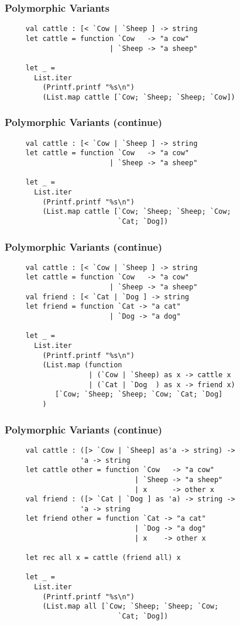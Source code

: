 \documentclass{beamer}
\begin{document}
\begin{frame}[fragile]
  \frametitle{Polymorphic Variants}
    \begin{lstlisting}
     val cattle : [< `Cow | `Sheep ] -> string 
     let cattle = function `Cow   -> "a cow" 
                         | `Sheep -> "a sheep" 

     let _ = 
       List.iter 
         (Printf.printf "%s\n") 
         (List.map cattle [`Cow; `Sheep; `Sheep; `Cow])
  \end{lstlisting}  
  
\end{frame}

\begin{frame}[fragile]
  \frametitle{Polymorphic Variants (continue)}
  \begin{lstlisting}
     val cattle : [< `Cow | `Sheep ] -> string 
     let cattle = function `Cow   -> "a cow" 
                         | `Sheep -> "a sheep" 

     let _ = 
       List.iter 
         (Printf.printf "%s\n") 
         (List.map cattle [`Cow; `Sheep; `Sheep; `Cow; 
                           `Cat; `Dog])
  \end{lstlisting}  


\end{frame}

\begin{frame}[fragile]
  \frametitle{Polymorphic Variants (continue)}
  \begin{lstlisting}
     val cattle : [< `Cow | `Sheep ] -> string 
     let cattle = function `Cow   -> "a cow" 
                         | `Sheep -> "a sheep" 
     val friend : [< `Cat | `Dog ] -> string
     let friend = function `Cat -> "a cat" 
                         | `Dog -> "a dog"

     let _ = 
       List.iter 
         (Printf.printf "%s\n") 
         (List.map (function 
                    | (`Cow | `Sheep) as x -> cattle x 
                    | (`Cat | `Dog  ) as x -> friend x)
            [`Cow; `Sheep; `Sheep; `Cow; `Cat; `Dog]
         )
  \end{lstlisting}  
\end{frame}

\begin{frame}[fragile]
  \frametitle{Polymorphic Variants (continue)}
  \begin{lstlisting}
     val cattle : ([> `Cow | `Sheep] as'a -> string) -> 
                  'a -> string 
     let cattle other = function `Cow   -> "a cow" 
                               | `Sheep -> "a sheep"
                               | x      -> other x 
     val friend : ([> `Cat | `Dog ] as 'a) -> string -> 
                  'a -> string
     let friend other = function `Cat -> "a cat" 
                               | `Dog -> "a dog"
                               | x    -> other x

     let rec all x = cattle (friend all) x

     let _ = 
       List.iter 
         (Printf.printf "%s\n") 
         (List.map all [`Cow; `Sheep; `Sheep; `Cow; 
                           `Cat; `Dog])
  \end{lstlisting}  
\end{frame}
\end{document}

